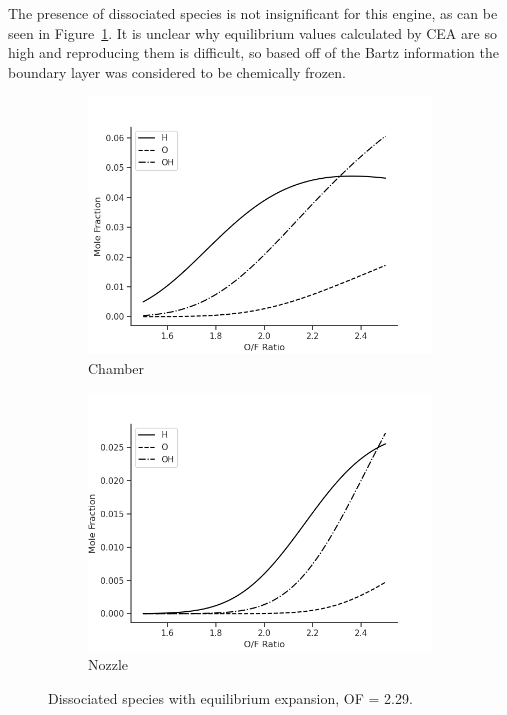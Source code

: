 \documentclass[11pt]{article}
\begin{document}
The presence of dissociated species is not insignificant for this engine, as can be seen in Figure~\ref{fig:dissociated}. It is unclear why equilibrium values calculated by CEA are so high and reproducing them is difficult, so based off of the Bartz information the boundary layer was considered to be chemically frozen.

\begin{figure}[H]
  \centering
  \begin{subfigure}{.5\textwidth}
    \centering
    \includegraphics[width=\linewidth]{dissociated-chamber.png}
    \caption{Chamber}
  \end{subfigure}%
  \begin{subfigure}{.5\textwidth}
    \centering
    \includegraphics[width=\linewidth]{dissociated-nozzle.png}
    \caption{Nozzle}
  \end{subfigure}
  \caption{Dissociated species with equilibrium expansion, OF = 2.29.}
  \label{fig:dissociated}
\end{figure}
\end{document}
